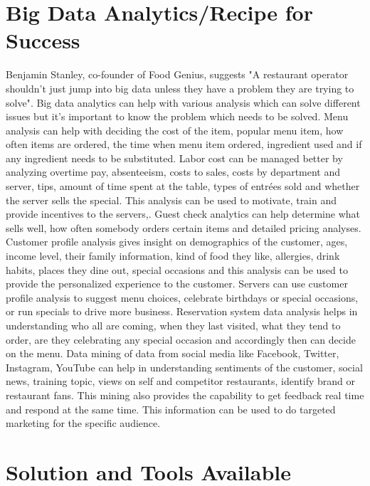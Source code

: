 \documentclass[sigconf]{acmart}
\begin{document}
\section{Big Data Analytics/Recipe for Success}
Benjamin Stanley, co-founder of Food Genius, suggests "A restaurant operator shouldn't just jump into big data unless they have a problem they are trying to solve"\cite{KooserAmandaC.2013BD}. Big data analytics can help with various analysis which can solve different issues but it’s important to know the problem which needs to be solved. Menu analysis can help with deciding the cost of the item, popular menu item, how often items are ordered, the time when menu item ordered, ingredient used and if any ingredient needs to be substituted\cite{KooserAmandaC.2013BD}. Labor cost can be managed better by analyzing overtime pay, absenteeism, costs to sales, costs by department and server, tips, amount of time spent at the table, types of entrées sold and whether the server sells the special. This analysis can be used to motivate, train and provide incentives to the servers\cite{www-restaurant},\cite{KooserAmandaC.2013BD}. Guest check analytics can help determine what sells well, how often somebody orders certain items and detailed pricing analyses\cite{www-restaurant}. Customer profile analysis gives insight on demographics of the customer, ages, income level, their family information, kind of food they like, allergies, drink habits, places they dine out, special occasions and this analysis can be used to provide the personalized experience to the customer\cite{www-restaurant}. Servers can use customer profile analysis to suggest menu choices, celebrate birthdays or special occasions, or run specials to drive more business. Reservation system data analysis helps in understanding who all are coming, when they last visited, what they tend to order, are they celebrating any special occasion and accordingly then can decide on the menu\cite{www-bostonglobe}. Data mining of data from social media like Facebook, Twitter, Instagram, YouTube can help in understanding sentiments of the customer, social news, training topic, views on self and competitor restaurants, identify brand or restaurant fans\cite{JENNINGSLISA2015Mbds}. This mining also provides the capability to get feedback real time and respond at the same time. This information can be used to do targeted marketing for the specific audience\cite{JENNINGSLISA2015Mbds}. 

\section{Solution and Tools Available}
\end{document}

